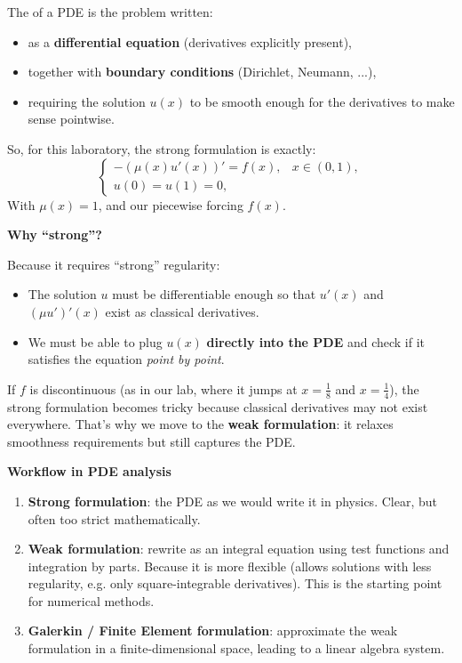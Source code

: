 \begin{deepeningbox}
    The  of a PDE is the problem written:
    \begin{itemize}
        \item as a \textbf{differential equation} (derivatives explicitly present),
        \item together with \textbf{boundary conditions} (Dirichlet, Neumann, ...),
        \item requiring the solution $u(x)$ to be smooth enough for the derivatives to make sense pointwise.
    \end{itemize}
    So, for this laboratory, the strong formulation is exactly:
    \begin{equation*}
        \begin{cases}
            - \left(\mu(x) u'(x)\right)' = f(x), & x \in (0,1), \\[.5em]
            u(0) = u(1) = 0, &
        \end{cases}
    \end{equation*}
    With $\mu(x) = 1$, and our piecewise forcing $f(x)$.

    \highspace
    \begin{flushleft}
        \textcolor{Green3}{ \textbf{Why ``strong''?}}
    \end{flushleft}
    Because it requires ``strong'' regularity:
    \begin{itemize}
        \item The solution $u$ must be differentiable enough so that $u'(x)$ and $(\mu u')'(x)$ exist as classical derivatives.
        \item We must be able to plug $u(x)$ \textbf{directly into the PDE} and check if it satisfies the equation \emph{point by point}.
    \end{itemize}
    If $f$ is discontinuous (as in our lab, where it jumps at $x=\frac{1}{8}$ and $x=\frac{1}{4}$), the strong formulation becomes tricky because classical derivatives may not exist everywhere. That's why we move to the \textbf{weak formulation}: it relaxes smoothness requirements but still captures the PDE.

    \highspace
    \begin{flushleft}
        \textcolor{Green3}{ \textbf{Workflow in PDE analysis}}
    \end{flushleft}
    \begin{enumerate}
        \item \textbf{Strong formulation}: the PDE as we would write it in physics. Clear, but often too strict mathematically.
        \item \textbf{Weak formulation}: rewrite as an integral equation using test functions and integration by parts. Because it is more flexible (allows solutions with less regularity, e.g. only square-integrable derivatives). This is the starting point for numerical methods.
        \item \textbf{Galerkin / Finite Element formulation}: approximate the weak formulation in a finite-dimensional space, leading to a linear algebra system.
    \end{enumerate}
\end{deepeningbox}